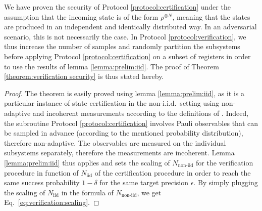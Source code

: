 \documentclass[a4paper,twocolumn,11pt,unpublished]{../../revision/quantumarticle}
\newcommand{\Niid}{N_{\mathrm{iid}}}
\newcommand{\Nnoniid}{N_{\mathrm{non\text{-}iid}}}
\begin{document}
We have proven the security of Protocol \ref{protocol:certification} under the assumption that the incoming state is of the form $\rho^{\otimes N}$, meaning that the states are produced in an independent and identically distributed way. In an adversarial scenario, this is not necessarily the case. In Protocol \ref{protocol:verification}, we thus increase the number of samples and randomly partition the subsystems before applying Protocol \ref{protocol:certification} on a subset of registers in order to use the results of lemma \ref{lemma:prelim:iid}. The proof of Theorem \ref{theorem:verification security} is thus stated hereby.

        \begin{proof}
            The theorem is easily proved using lemma \ref{lemma:prelim:iid}, as it is a particular instance of state certification in the non-i.i.d.\ setting using non-adaptive and incoherent measurements according to the definitions of \cite{FKMO24learning}. Indeed, the subroutine Protocol \ref{protocol:certification} involves Pauli observables that can be sampled in advance (according to the mentioned probability distribution), therefore non-adaptive. The observables are measured on the individual subsystems separately, therefore the measurements are incoherent. Lemma \ref{lemma:prelim:iid} thus applies and sets the scaling of $\Nnoniid$ for the verification procedure
            in function of $\Niid$ of the certification procedure in order to reach the same success probability $1-\delta$ for the same target precision $\epsilon$. By simply plugging the scaling of $\Niid$ in the formula of $\Nnoniid$, we get Eq.~\eqref{eq:verification:scaling}.
        \end{proof}
\end{document}
